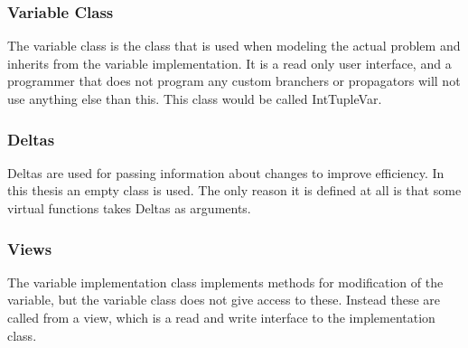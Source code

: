 \documentclass[a4paper,11pt]{article}
\begin{document}
\subsubsection{Variable Class}
The variable class is the class that is used when modeling the actual problem and inherits from the variable implementation. It is a read only user interface, and a programmer that does not program any custom branchers or propagators will not use anything else than this. This class would be called IntTupleVar.
\subsubsection{Deltas}
Deltas are used for passing information about changes to improve efficiency. In this thesis an empty class is used. The only reason it is defined at all is that some virtual functions takes Deltas as arguments.

\subsubsection{Views}
The variable implementation class implements methods for modification of the variable, but the variable class does not give access to these. Instead these are called from a view, which is a read and write interface to the implementation class.
\end{document}
